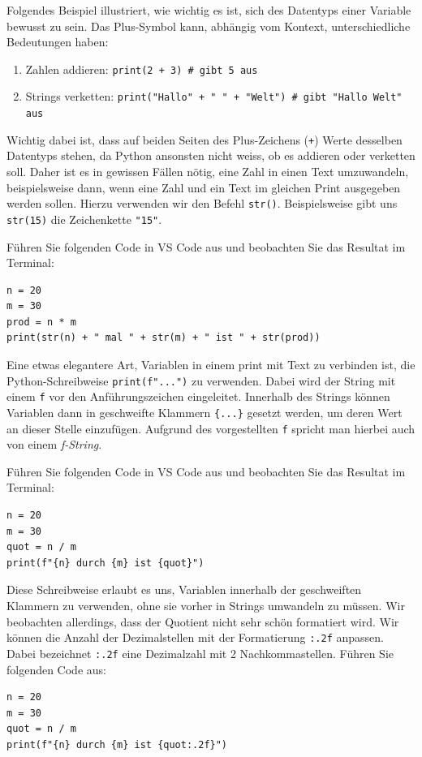Folgendes Beispiel illustriert, wie wichtig es ist, sich des Datentyps einer Variable bewusst zu sein. Das Plus-Symbol kann, abhängig vom Kontext, unterschiedliche Bedeutungen haben:
\begin{enumerate}
	\item Zahlen addieren: \lstinline|print(2 + 3) # gibt 5 aus|
	\item Strings verketten: \lstinline|print("Hallo" + " " + "Welt") # gibt "Hallo Welt" aus|
\end{enumerate}
Wichtig dabei ist, dass auf beiden Seiten des Plus-Zeichens (\lstinline|+|) Werte desselben Datentyps stehen, da Python ansonsten nicht weiss, ob es addieren oder verketten soll. Daher ist es in gewissen Fällen nötig, eine Zahl in einen Text umzuwandeln, beispielsweise dann, wenn eine Zahl und ein Text im gleichen Print ausgegeben werden sollen. Hierzu verwenden wir den Befehl \lstinline|str()|. Beispielsweise gibt uns \lstinline|str(15)| die Zeichenkette \lstinline|"15"|.


\begin{myexample} Führen Sie folgenden Code in VS Code aus und beobachten Sie das Resultat im Terminal:
\begin{lstlisting}[numbers=none]
n = 20
m = 30
prod = n * m
print(str(n) + " mal " + str(m) + " ist " + str(prod))
\end{lstlisting}
\end{myexample}

Eine etwas elegantere Art, Variablen in einem print mit Text zu verbinden ist, die Python-Schreibweise \lstinline|print(f"...")| zu verwenden. Dabei wird der String mit einem \lstinline|f| vor den Anführungszeichen eingeleitet. Innerhalb des Strings können Variablen dann in geschweifte Klammern \lstinline|{...}| gesetzt werden, um deren Wert an dieser Stelle einzufügen. Aufgrund des vorgestellten \lstinline|f| spricht man hierbei auch von einem \emph{f-String}.

\begin{myexample}
Führen Sie folgenden Code in VS Code aus und beobachten Sie das Resultat im Terminal:
\begin{lstlisting}[numbers=none]
n = 20
m = 30
quot = n / m
print(f"{n} durch {m} ist {quot}")
\end{lstlisting}
Diese Schreibweise erlaubt es uns, Variablen innerhalb der geschweiften Klammern zu verwenden, ohne sie vorher in Strings umwandeln zu müssen. Wir beobachten allerdings, dass der Quotient nicht sehr schön formatiert wird. Wir können die Anzahl der Dezimalstellen mit der Formatierung \lstinline|:.2f| anpassen. Dabei bezeichnet \lstinline|:.2f| eine Dezimalzahl mit 2 Nachkommastellen. Führen Sie folgenden Code aus:
\begin{lstlisting}[numbers=none]
n = 20
m = 30
quot = n / m
print(f"{n} durch {m} ist {quot:.2f}")
\end{lstlisting}
\end{myexample}

